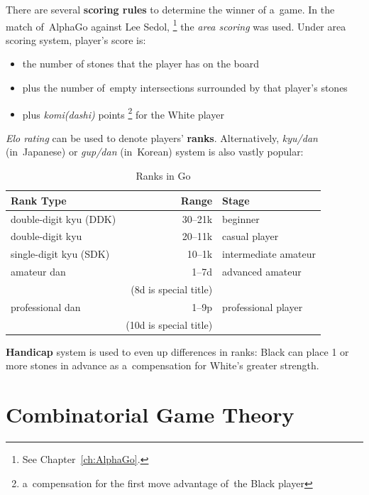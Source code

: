 There are several \textbf{scoring rules} to determine the winner of a~game.
In the match of~AlphaGo against Lee Sedol,%
\footnote{See Chapter~\ref{ch:AlphaGo}.}
the \emph{area scoring} was used.
Under area scoring system, player's score is:
\begin{itemize}
  \item the number of stones that the player has on the board
  \item plus the number of~empty intersections surrounded by that player's stones
  \item plus \emph{komi(dashi)} points%
    \footnote{a~compensation for the first move advantage of~the Black player}
    for the White player
\end{itemize}

\emph{Elo rating} can be used to denote players' \textbf{ranks}.
Alternatively, \emph{kyu/dan} (in~Japanese) or \emph{gup/dan} (in~Korean) system is also vastly popular:
\begin{table}[!htbp]
  \centering
  \begin{tabular}{ |l|r|l| }
    \hline
    \textbf{Rank Type} & \textbf{Range} & \textbf{Stage} \\
    \hline
    double-digit kyu\footnotemark{} (DDK) & 30--21k & beginner \\
    double-digit kyu                      & 20--11k & casual player \\
    single-digit kyu (SDK)                & 10--1k  & intermediate amateur \\
    amateur dan                           & 1--7d   & advanced amateur \\
    ~ & (8d is special title) & ~ \\
    professional dan                      & 1--9p   & professional player \\
    ~ & (10d is special title) & ~ \\
    \hline
  \end{tabular}
  \caption{Ranks in Go}
  \label{tab:Go-ranks}
\end{table}

\textbf{Handicap} system is used to even up differences in ranks:
Black can place 1 or more stones in advance as a~compensation for White's greater strength.

\section{Combinatorial Game Theory}
\label{sec:CGT}
\todo

